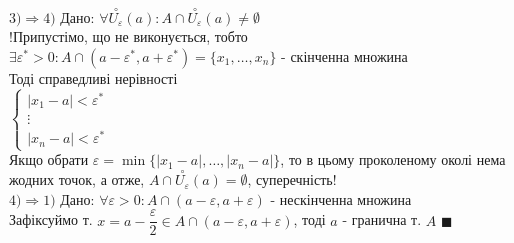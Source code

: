 \documentclass[a4paper, 14pt]{extarticle}
\def\bigline{\vspace{5mm}\\}
\def\bigline{\vspace{5mm}\\}
\def\qed{$\blacksquare$}
\begin{document}
\bigline
$\boxed{3) \Rightarrow 4)}$ Дано: $\forall \overset{\circ}{U_\varepsilon}(a): A \cap \overset{\circ}{U_\varepsilon}(a) \neq \emptyset$\\
!Припустімо, що не виконується, тобто $\exists \varepsilon^* > 0: A \cap (a-\varepsilon^*,a+\varepsilon^*) = \{x_1,\dots,x_n\}$ - скінченна множина\\
Тоді справедливі нерівності\\
$\begin{cases}
|x_1 - a| < \varepsilon^* \\
\vdots \\
|x_n - a| < \varepsilon^*
\end{cases}$\\
Якщо обрати $\varepsilon = \min \{|x_1-a|, \dots, |x_n-a|\}$, то в цьому проколеному околі нема жодних точок, а отже, $A \cap \overset{\circ}{U_\varepsilon}(a) = \emptyset$, суперечність!
\bigline
$\boxed{4) \Rightarrow 1)}$ Дано: $\forall \varepsilon > 0: A \cap (a-\varepsilon,a+\varepsilon)$ - нескінченна множина\\
Зафіксуймо т. $x = a - \dfrac{\varepsilon}{2} \in A \cap (a-\varepsilon,a+\varepsilon)$, тоді $a$ - гранична т. $A$ \qed
\bigline
\end{document}
